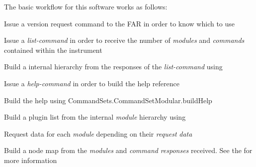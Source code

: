The basic workflow for this software works as follows\+:
\begin{DoxyItemize}
\item Issue a version request command to the FAR in order to know which  to use
\item Issue a {\itshape \textquotesingle{}list\textquotesingle{}-\/command} in order to receive the number of {\itshape modules} and {\itshape commands} contained within the instrument
\item Build a internal hierarchy from the responses of the {\itshape \textquotesingle{}list\textquotesingle{}-\/command} using 
\item Issue a {\itshape \textquotesingle{}help\textquotesingle{}-\/command} in order to build the help reference
\item Build the help using Command\+Sets.\+Command\+Set\+Modular.\+build\+Help
\item Build a plugin list from the internal {\itshape module} hierarchy using 
\item Request data for each {\itshape module} depending on their {\itshape request} {\itshape data} 
\item Build a node map from the {\itshape modules} and {\itshape command} {\itshape responses} received. See the  for more information 
\end{DoxyItemize}